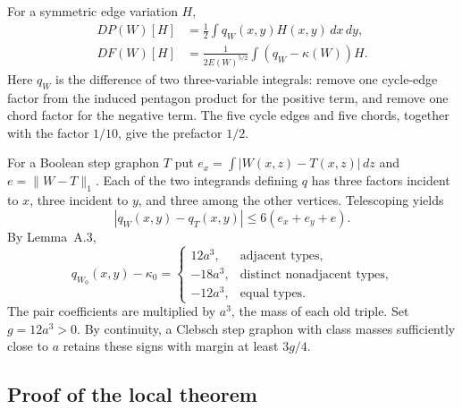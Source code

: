For a symmetric edge variation $H$,
\begin{equation}\tag{86}\label{eq:edge-variation}
 \begin{aligned}
 DP(W)[H]&=\frac12\int q_W(x,y)H(x,y)\,dx\,dy,\\
 DF(W)[H]&=\frac1{2E(W)^{5/2}}\int(q_W-\kappa(W))H.
 \end{aligned}
\end{equation}
Here $q_W$ is the difference of two three-variable integrals: remove
one cycle-edge factor from the induced pentagon product for the
positive term, and remove one chord factor for the negative term.
The five cycle edges and five chords, together with the factor $1/10$,
give the prefactor $1/2$.

For a Boolean step graphon $T$ put
$e_x=\int|W(x,z)-T(x,z)|\,dz$ and $e=\lVert W-T\rVert_1$. Each
of the two integrands defining $q$ has three factors incident to $x$,
three incident to $y$, and three among the other vertices.
Telescoping yields
\begin{equation}\tag{87}\label{eq:edge-variation-error}
 |q_W(x,y)-q_T(x,y)|\leq6(e_x+e_y+e).
\end{equation}
By Lemma~A.3,
\begin{equation}\tag{88}\label{eq:edge-sign-margin}
 q_{W_0}(x,y)-\kappa_0
 =\begin{cases}
   12a^3,&\text{adjacent types},\\
   -18a^3,&\text{distinct nonadjacent types},\\
   -12a^3,&\text{equal types}.
  \end{cases}
\end{equation}
The pair coefficients are multiplied by $a^3$, the mass of each old
triple. Set $g=12a^3>0$. By continuity, a Clebsch step graphon with
class masses sufficiently close to $a$ retains these signs with margin
at least $3g/4$.

\subsection{Proof of the local theorem}

